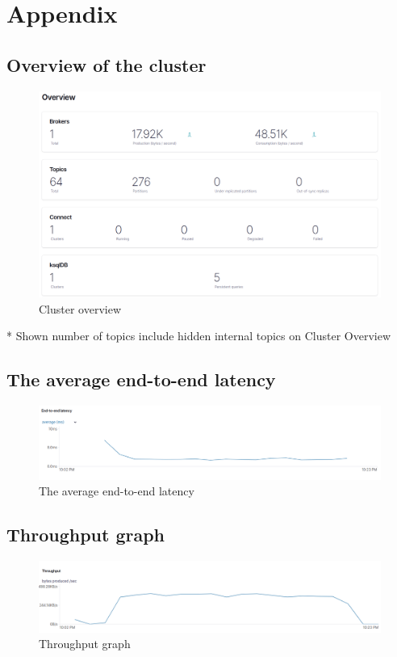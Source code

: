 \chapter{Appendix}


\section{Overview of the cluster}
\begin{figure}[H]
    \centerline{\includegraphics[scale=.3]{assets/appendices/overview.png}}
    \caption{Cluster overview  }
    \label{fig}
\end{figure}
* Shown number of topics include hidden internal topics on Cluster Overview
\section{The average end-to-end latency}
\begin{figure}[H]
    \centerline{\includegraphics[scale=.4]{assets/appendices/average-end-to-end-latency.png}}
    \caption{The average end-to-end latency}
    \label{fig}
\end{figure}

\section{Throughput graph}
\begin{figure}[H]
    \centerline{\includegraphics[scale=.4]{assets/appendices/throughput_graph.png}}
    \caption{Throughput graph}
    \label{fig}
\end{figure}

